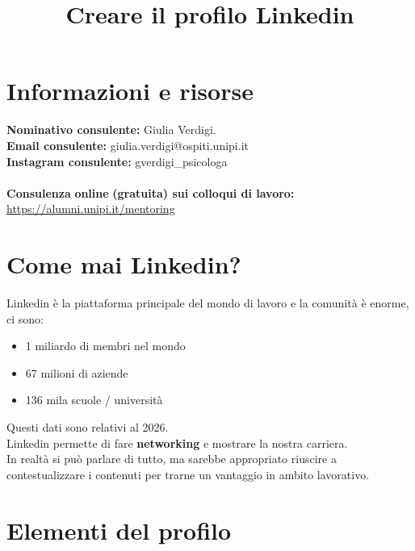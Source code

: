 \documentclass[12pt,a4paper]{article}
\title{Creare il profilo Linkedin}
\author{}
\date{}
\let\oldsection\section
\renewcommand{\section}{\clearpage\oldsection}
\begin{document}
\maketitle
\tableofcontents

\section{Informazioni e risorse}
\textbf{Nominativo consulente:} Giulia Verdigi.\\
\textbf{Email consulente:} giulia.verdigi@ospiti.unipi.it\\
\textbf{Instagram consulente:} gverdigi\_psicologa\\\\
\textbf{Consulenza} \textbf{online} \textbf{(gratuita) sui colloqui di lavoro:}
\href{https://alumni.unipi.it/mentoring}{https://alumni.unipi.it/mentoring}

\section{Come mai Linkedin?}
Linkedin è la piattaforma principale del mondo di lavoro e la comunità è enorme, ci sono:
\begin{itemize}
    \item 1 miliardo di membri nel mondo
    \item 67 milioni di aziende
    \item 136 mila scuole / università
\end{itemize}
Questi dati sono relativi al 2026.\\
Linkedin permette di fare \textbf{networking} e mostrare la nostra carriera.\\
In realtà si può parlare di tutto, ma sarebbe appropriato riuscire a contestualizzare i contenuti per trarne un vantaggio in ambito lavorativo.

\section{Elementi del profilo}
\end{document}
